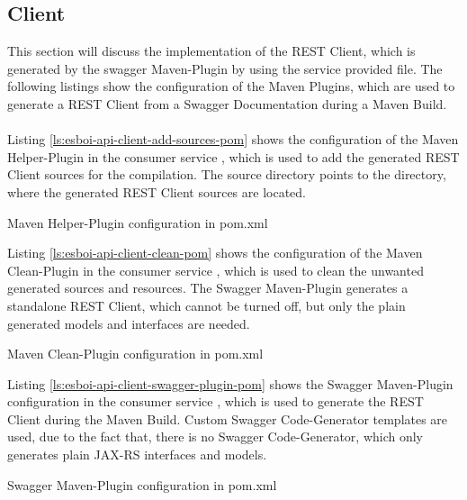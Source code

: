 \subsection{Client}
\label{sec:esbi-api-client}
This section will discuss the implementation of the REST Client, which is generated by the swagger Maven-Plugin by using the service provided  file. The following listings show the configuration of the Maven Plugins, which are used to generate a REST Client from a Swagger Documentation during a Maven Build.
\\ \\
Listing \vref{ls:esboi-api-client-add-sources-pom} shows the configuration of the Maven Helper-Plugin in the consumer service , which is used to add the generated REST Client sources for the compilation. The source directory points to the directory, where the generated REST Client sources are located.
\newpage 

\begin{listing}[h]
	\caption{Maven Helper-Plugin configuration in pom.xml}
	\label{ls:esboi-api-client-add-sources-pom}
\end{listing}

Listing \vref{ls:esboi-api-client-clean-pom} shows the configuration of the Maven Clean-Plugin in the consumer service , which is used to clean the unwanted generated sources and resources. The Swagger Maven-Plugin generates a standalone REST Client, which cannot be turned off, but only the plain generated models and interfaces are needed. 

\begin{listing}[h]
	\caption{Maven Clean-Plugin configuration in pom.xml}
	\label{ls:esboi-api-client-clean-pom}
\end{listing}

Listing \vref{ls:esboi-api-client-swagger-plugin-pom} shows the Swagger Maven-Plugin configuration in the consumer service , which is used to generate the REST Client during the Maven Build. Custom Swagger Code-Generator templates are used, due to the fact that, there is no Swagger Code-Generator, which only generates plain JAX-RS interfaces and models. 
\newpage

\begin{listing}[h]
	\caption{Swagger Maven-Plugin configuration in pom.xml}
	\label{ls:esboi-api-client-swagger-plugin-pom}
\end{listing}

